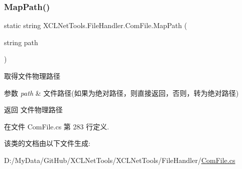 \subsubsection{\texorpdfstring{Map\+Path()}{MapPath()}}
{\footnotesize\ttfamily static string X\+C\+L\+Net\+Tools.\+File\+Handler.\+Com\+File.\+Map\+Path (\begin{DoxyParamCaption}\item[{string}]{path }\end{DoxyParamCaption})\hspace{0.3cm}{\ttfamily [static]}}



取得文件物理路径 


\begin{DoxyParams}{参数}
{\em path} & 文件路径(如果为绝对路径，则直接返回，否则，转为绝对路径)\\
\hline
\end{DoxyParams}
\begin{DoxyReturn}{返回}
文件物理路径
\end{DoxyReturn}


在文件 Com\+File.\+cs 第 283 行定义.



该类的文档由以下文件生成\+:\begin{DoxyCompactItemize}
\item 
D\+:/\+My\+Data/\+Git\+Hub/\+X\+C\+L\+Net\+Tools/\+X\+C\+L\+Net\+Tools/\+File\+Handler/\hyperlink{_com_file_8cs}{Com\+File.\+cs}\end{DoxyCompactItemize}
